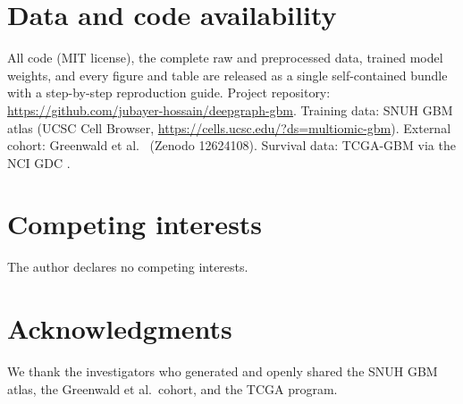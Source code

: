 \documentclass[11pt,letterpaper]{article}
\begin{document}
\section*{Data and code availability}
All code (MIT license), the complete raw and preprocessed data, trained model weights, and every figure and table are released as a single self-contained bundle with a step-by-step reproduction guide. Project repository: \url{https://github.com/jubayer-hossain/deepgraph-gbm}. Training data: SNUH GBM atlas \cite{park2026} (UCSC Cell Browser, \url{https://cells.ucsc.edu/?ds=multiomic-gbm}). External cohort: Greenwald et al.\ \cite{greenwald2024} (Zenodo 12624108). Survival data: TCGA-GBM via the NCI GDC \cite{tcga2008}.

\section*{Competing interests}
The author declares no competing interests.

\section*{Acknowledgments}
We thank the investigators who generated and openly shared the SNUH GBM atlas, the Greenwald et al.\ cohort, and the TCGA program.



\end{document}
